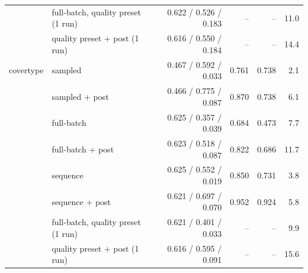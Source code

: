 \begin{tabular}{llrrrr}
 & full-batch, quality preset (1 run) & 0.622 / 0.526 / 0.183 & -- & -- & 11.0 \\
 & quality preset + post (1 run) & 0.616 / 0.550 / 0.184 & -- & -- & 14.4 \\
\midrule
covertype & sampled & 0.467 / 0.592 / 0.033 & 0.761 & 0.738 & 2.1 \\
 & sampled + post & 0.466 / 0.775 / 0.087 & 0.870 & 0.738 & 6.1 \\
 & full-batch & 0.625 / 0.357 / 0.039 & 0.684 & 0.473 & 7.7 \\
 & full-batch + post & 0.623 / 0.518 / 0.087 & 0.822 & 0.686 & 11.7 \\
 & sequence & 0.625 / 0.552 / 0.019 & 0.850 & 0.731 & 3.8 \\
 & sequence + post & 0.621 / 0.697 / 0.070 & 0.952 & 0.924 & 5.8 \\
 & full-batch, quality preset (1 run) & 0.621 / 0.401 / 0.033 & -- & -- & 9.9 \\
 & quality preset + post (1 run) & 0.616 / 0.595 / 0.091 & -- & -- & 15.6 \\
\bottomrule
\end{tabular}
